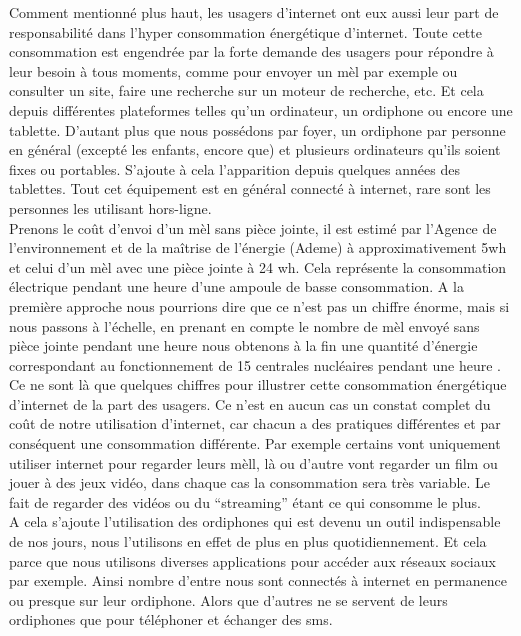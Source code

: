 \documentclass[a4paper,twocolumn,12pt]{article}
\begin{document}
	Comment mentionné plus haut, les usagers d’internet ont eux aussi leur part de responsabilité dans l'hyper consommation énergétique d’internet. Toute cette consommation est engendrée par la forte demande des usagers pour répondre à leur besoin à tous moments, comme pour envoyer un mèl par exemple ou consulter un site, faire une recherche sur un moteur de recherche, etc. Et cela depuis différentes plateformes telles qu’un ordinateur, un ordiphone ou encore une tablette. D'autant plus que nous possédons par foyer, un ordiphone par personne en général (excepté les enfants, encore que) et plusieurs ordinateurs qu’ils soient fixes ou portables. S’ajoute à cela l’apparition depuis quelques années des tablettes. Tout cet équipement est en général connecté à internet, rare sont les personnes les utilisant hors-ligne. \\

	Prenons le coût d'envoi d’un mèl sans pièce jointe, il est estimé par l’Agence de l’environnement et de la maîtrise de l’énergie (Ademe) à approximativement 5wh et celui d'un mèl avec une pièce jointe à 24 wh. Cela représente la consommation électrique pendant une heure d’une ampoule de basse consommation. A la première approche nous pourrions dire que ce n’est pas un chiffre énorme, mais si nous passons à l'échelle, en prenant en compte le nombre de mèl envoyé sans pièce jointe pendant une heure nous obtenons à la fin une quantité d'énergie correspondant au fonctionnement de 15 centrales nucléaires pendant une heure \cite{11}. \\

	Ce ne sont là que quelques chiffres pour illustrer cette consommation énergétique d’internet de la part des usagers. Ce n’est en aucun cas un constat complet du coût de notre utilisation d’internet, car chacun a des pratiques différentes et par conséquent une consommation différente. Par exemple certains vont uniquement utiliser internet pour regarder leurs mèll, là ou d’autre vont regarder un film ou jouer à des jeux vidéo, dans chaque cas la consommation sera très variable. Le fait de regarder des vidéos ou du “streaming” étant ce qui consomme le plus. \\ 

	A cela s’ajoute l’utilisation des ordiphones qui est devenu un outil indispensable de nos jours, nous l'utilisons en effet de plus en plus quotidiennement. Et cela parce que nous utilisons diverses applications pour accéder aux réseaux sociaux par exemple. Ainsi nombre d’entre nous sont connectés à internet en permanence ou presque sur leur ordiphone. Alors que d’autres ne se servent de leurs ordiphones que pour téléphoner et échanger des sms. \\
\end{document}
